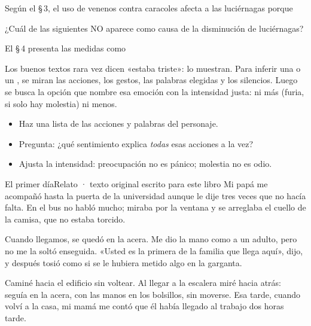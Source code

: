 \taller
{}
\begin{ejercicios}
\item Según el \S\,3, el uso de venenos contra caracoles afecta a las luciérnagas porque
\item ¿Cuál de las siguientes NO aparece como causa de la disminución de luciérnagas?
\item El \S\,4 presenta las medidas como
\end{ejercicios}

\bitacora


Los buenos textos rara vez dicen «estaba triste»: lo muestran. Para inferir una  o un , se
miran las acciones, los gestos, las palabras elegidas y los silencios. Luego se busca la opción que nombre esa emoción
con la intensidad justa: ni más (furia, si solo hay molestia) ni menos.


\begin{regla}
\begin{itemize}
  \item Haz una lista de las acciones y palabras del personaje.
  \item Pregunta: ¿qué sentimiento explica \emph{todas} esas acciones a la vez?
  \item Ajusta la intensidad: preocupación no es pánico; molestia no es odio.
\end{itemize}
\end{regla}

\begin{texto}{El primer día}{Relato · texto original escrito para este libro}
\pa Mi papá me acompañó hasta la puerta de la universidad aunque le dije tres veces que no hacía falta. En el bus no habló
mucho; miraba por la ventana y se arreglaba el cuello de la camisa, que no estaba torcido.

\pa Cuando llegamos, se quedó en la acera. Me dio la mano como a un adulto, pero no me la soltó enseguida. «Usted es la
primera de la familia que llega aquí», dijo, y después tosió como si se le hubiera metido algo en la garganta.

\pa Caminé hacia el edificio sin voltear. Al llegar a la escalera miré hacia atrás: seguía en la acera, con las manos en
los bolsillos, sin moverse. Esa tarde, cuando volví a la casa, mi mamá me contó que él había llegado al trabajo dos horas
tarde.
\end{texto}

